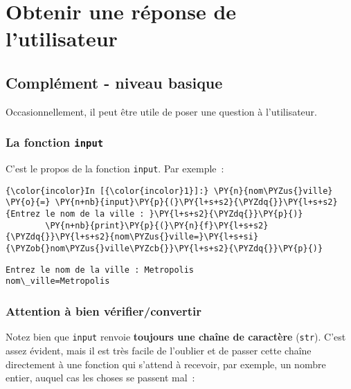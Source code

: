     \hypertarget{obtenir-une-ruxe9ponse-de-lutilisateur}{%
\section{Obtenir une réponse de
l'utilisateur}\label{obtenir-une-ruxe9ponse-de-lutilisateur}}

    \hypertarget{compluxe9ment---niveau-basique}{%
\subsection{Complément - niveau
basique}\label{compluxe9ment---niveau-basique}}

    Occasionnellement, il peut être utile de poser une question à
l'utilisateur.

    \hypertarget{la-fonction-input}{%
\subsubsection{\texorpdfstring{La fonction
\texttt{input}}{La fonction input}}\label{la-fonction-input}}

    C'est le propos de la fonction \texttt{input}. Par exemple~:

    \begin{Verbatim}[commandchars=\\\{\}]
{\color{incolor}In [{\color{incolor}1}]:} \PY{n}{nom\PYZus{}ville} \PY{o}{=} \PY{n+nb}{input}\PY{p}{(}\PY{l+s+s2}{\PYZdq{}}\PY{l+s+s2}{Entrez le nom de la ville : }\PY{l+s+s2}{\PYZdq{}}\PY{p}{)}
        \PY{n+nb}{print}\PY{p}{(}\PY{n}{f}\PY{l+s+s2}{\PYZdq{}}\PY{l+s+s2}{nom\PYZus{}ville=}\PY{l+s+si}{\PYZob{}nom\PYZus{}ville\PYZcb{}}\PY{l+s+s2}{\PYZdq{}}\PY{p}{)}
\end{Verbatim}


    \begin{Verbatim}[commandchars=\\\{\}]
Entrez le nom de la ville : Metropolis
nom\_ville=Metropolis

    \end{Verbatim}

    \hypertarget{attention-uxe0-bien-vuxe9rifierconvertir}{%
\subsubsection{Attention à bien
vérifier/convertir}\label{attention-uxe0-bien-vuxe9rifierconvertir}}

    Notez bien que \texttt{input} renvoie \textbf{toujours une chaîne de
caractère} (\texttt{str}). C'est assez évident, mais il est très facile
de l'oublier et de passer cette chaîne directement à une fonction qui
s'attend à recevoir, par exemple, un nombre entier, auquel cas les
choses se passent mal~:

